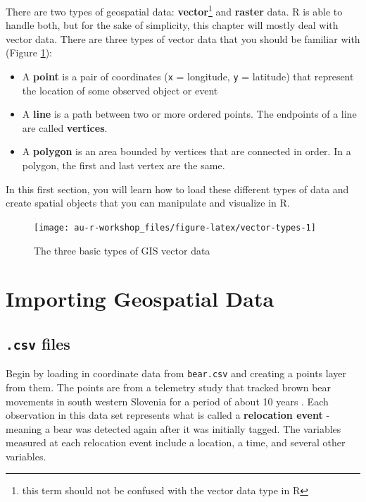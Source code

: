 \documentclass[]{book}
\providecommand{\tightlist}{%
  \setlength{\itemsep}{0pt}\setlength{\parskip}{0pt}}
\let\rmarkdownfootnote\footnote%
\def\footnote{\protect\rmarkdownfootnote}
\theoremstyle{definition}
\theoremstyle{definition}
\theoremstyle{definition}
\theoremstyle{remark}
\begin{document}
There are two types of geospatial data: \textbf{vector}\footnote{this
  term should not be confused with the vector data type in R} and
\textbf{raster} data. R is able to handle both, but for the sake of
simplicity, this chapter will mostly deal with vector data. There are
three types of vector data that you should be familiar with (Figure
\ref{fig:vector-types}):

\begin{itemize}
\tightlist
\item
  A \textbf{point} is a pair of coordinates (\texttt{x} = longitude,
  \texttt{y} = latitude) that represent the location of some observed
  object or event
\item
  A \textbf{line} is a path between two or more ordered points. The
  endpoints of a line are called \textbf{vertices}.
\item
  A \textbf{polygon} is an area bounded by vertices that are connected
  in order. In a polygon, the first and last vertex are the same.
\end{itemize}

In this first section, you will learn how to load these different types
of data and create spatial objects that you can manipulate and visualize
in R.

\begin{figure}

{\centering \texttt{[image: au-r-workshop\_files/figure-latex/vector-types-1]} 

}

\caption{The three basic types of GIS vector data}\label{fig:vector-types}
\end{figure}

\section{Importing Geospatial Data}\label{Import}

\subsection{\texorpdfstring{\texttt{.csv}
files}{.csv files}}\label{csv-files-1}

Begin by loading in coordinate data from \texttt{bear.csv} and creating
a points layer from them. The points are from a telemetry study that
tracked brown bear movements in south western Slovenia for a period of
about 10 years \citep{bears-cite}. Each observation in this data set
represents what is called a \textbf{relocation event} - meaning a bear
was detected again after it was initially tagged. The variables measured
at each relocation event include a location, a time, and several other
variables.
\end{document}
